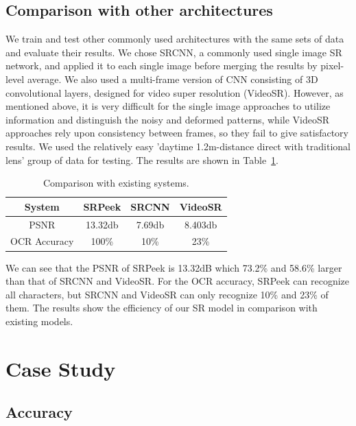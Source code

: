 \subsection{Comparison with other architectures}
We train and test other commonly used architectures with the same sets of data and evaluate their results. We chose SRCNN, a commonly used single image SR network, and applied it to each single image before merging the results by pixel-level average. We also used a multi-frame version of CNN consisting of 3D convolutional layers, designed for video super resolution (VideoSR). However, as mentioned above, it is very difficult for the single image approaches to utilize information and distinguish the noisy and deformed patterns, while VideoSR approaches rely upon consistency between frames, so they fail to give satisfactory results. We used the relatively easy 'daytime 1.2m-distance direct with traditional lens' group of data for testing. The results are shown in Table~\ref{table-comp}.
\begin{table}[!t]
    \centering
    \caption{Comparison with existing systems.}
    \begin{tabular}{@{}cccc@{}}
        \toprule
    System & SRPeek & SRCNN & VideoSR \\ \midrule
    PSNR & 13.32db & 7.69db & 8.403db\\ 
    OCR Accuracy & 100\% & 10\% & 23\%\\ \bottomrule
    \end{tabular}
    \label{table-comp}
\end{table}

We can see that the PSNR of SRPeek is 13.32dB which 73.2\% and 58.6\% larger than that of SRCNN and VideoSR. For the OCR accuracy, SRPeek can recognize all characters, but SRCNN and VideoSR can only recognize 10\% and 23\% of them. The results show the efficiency of our SR model in comparison with existing models.

\section{Case Study}
\label{case-study}
\subsection{Accuracy}

